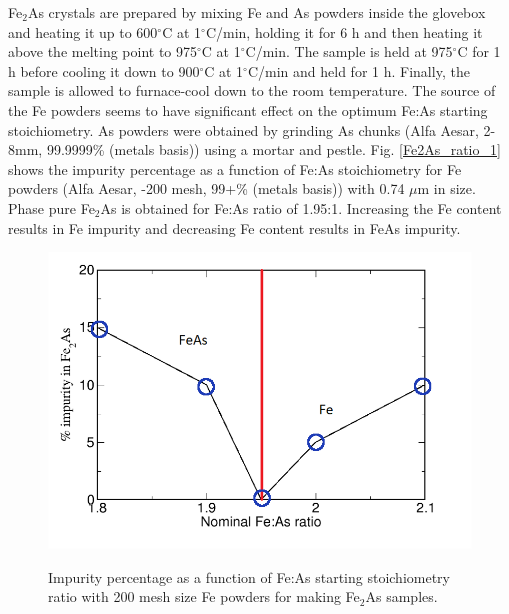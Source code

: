 \documentclass[10pt,doublespacing,edeposit]{uiucthesis2020}
\begin{document}
\begin{mainmatter}
Fe$_2$As crystals are prepared by mixing Fe and As powders inside the glovebox and heating it up to 600$^\circ$C at 1$^\circ$C/min, holding it for 6 h and then heating it above the melting point to 975$^\circ$C at 1$^\circ$C/min. The sample is held at 975$^\circ$C for 1 h before cooling it down to 900$^\circ$C at 1$^\circ$C/min and held for 1 h. Finally, the sample is allowed to furnace-cool down to the room temperature. The source of the Fe powders seems to have significant effect on the optimum Fe:As starting stoichiometry. As powders were obtained by grinding As chunks (Alfa Aesar, 2-8mm, 99.9999\% (metals basis)) using a mortar and pestle. Fig. \ref{Fe2As_ratio_1} shows the impurity percentage as a function of Fe:As stoichiometry for Fe powders (Alfa Aesar, -200 mesh, 99+\% (metals basis)) with 0.74 $\mu$m in size. Phase pure Fe$_2$As is obtained for Fe:As ratio of 1.95:1. Increasing the Fe content results in Fe impurity and decreasing Fe content results in FeAs impurity.

\begin{figure}
\centering\includegraphics[width=0.5\columnwidth]{figures/ch3/Fe2As_ratio_1.png} \\
\caption{\label{fig:Fe2As_ratio_1}
Impurity percentage as a function of Fe:As starting stoichiometry ratio with 200 mesh size Fe powders for making Fe$_2$As samples.
}
\end{figure}


\end{mainmatter}
\end{document}
